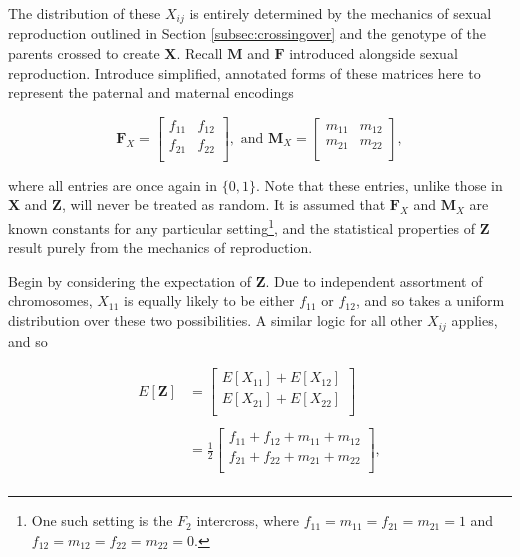 \documentclass{article}
\newcommand{\ve}[1]{\mathbf{#1}}           %
\newcommand{\m}[1]{\mathbf{#1}}               %
\begin{document}
\noindent The distribution of these $X_{ij}$ is entirely determined by the mechanics of sexual reproduction outlined in Section \ref{subsec:crossingover} and the genotype of the parents crossed to create $\m{X}$. Recall $\m{M}$ and $\m{F}$ introduced alongside sexual reproduction. Introduce simplified, annotated forms of these matrices here to represent the paternal and maternal encodings

$$\m{F}_X = \begin{bmatrix}
  f_{11} & f_{12} \\
  f_{21} & f_{22} \\
\end{bmatrix}, \text{ and }
\m{M}_X = \begin{bmatrix}
  m_{11} & m_{12} \\
  m_{21} & m_{22} \\
\end{bmatrix},$$

\noindent where all entries are once again in $\{0,1\}$. Note that these entries, unlike those in $\m{X}$ and $\ve{Z}$, will never be treated as random. It is assumed that $\m{F}_X$ and $\m{M}_X$ are known constants for any particular setting\footnote{One such setting is the $F_2$ intercross, where $f_{11} = m_{11} = f_{21} = m_{21} = 1$ and $f_{12} = m_{12} = f_{22} = m_{22} = 0$.}, and the statistical properties of $\ve{Z}$ result purely from the mechanics of reproduction.

Begin by considering the expectation of $\ve{Z}$. Due to independent assortment of chromosomes, $X_{11}$ is equally likely to be either $f_{11}$ or $f_{12}$, and so takes a uniform distribution over these two possibilities. A similar logic for all other $X_{ij}$ applies, and so

\begin{equation*}
  \begin{split}
    E[\ve{Z}] & = {\begin{bmatrix}
        E[X_{11}] + E[X_{12}] \\
        E[X_{21}] + E[X_{22}] \\
      \end{bmatrix}} \\
    & \\
    & = {\frac{1}{2}\begin{bmatrix}
        f_{11} + f_{12} + m_{11} + m_{12} \\
        f_{21} + f_{22} + m_{21} + m_{22} \\
      \end{bmatrix}}, \\
  \end{split}
\end{equation*}
\end{document}
